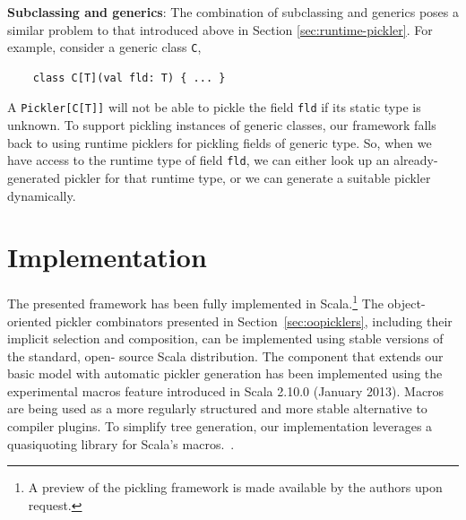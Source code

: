 \documentclass[preprint,10pt]{sigplanconf}
\theoremstyle{definition}
\theoremstyle{definition}
\newcommand{\term}[1]{\mbox{\texttt{#1}}}
\begin{document}
{\bf Subclassing and generics}: The combination of subclassing and generics
poses a similar problem to that introduced above in Section \ref{sec:runtime-pickler}.
For example, consider a generic class \term{C},

\begin{lstlisting}
    class C[T](val fld: T) { ... }
\end{lstlisting}

A \term{Pickler[C[T]]} will not be able to pickle the field \term{fld} if its
static type is unknown. To support pickling instances of generic classes, our
framework falls back to using runtime picklers for pickling fields of generic
type. So, when we have access to the runtime type of field \term{fld}, we can
either look up an already-generated pickler for that runtime type, or we can
generate a suitable pickler dynamically.



\section{Implementation}

The presented framework has been fully implemented in Scala.\footnote{A
preview of the pickling framework is made available by the authors upon
request.} The object-oriented pickler combinators presented in
Section~\ref{sec:oopicklers}, including their implicit selection and
composition, can be implemented using stable versions of the standard, open-
source Scala distribution. The component that extends our basic model with
automatic pickler generation has been implemented using the experimental
macros feature introduced in Scala 2.10.0 (January 2013). Macros are being
used as a more regularly structured and more stable alternative to compiler
plugins. To simplify tree generation, our implementation leverages a
quasiquoting library for Scala's macros.~\cite{Quasiquotes}.





\end{document}
